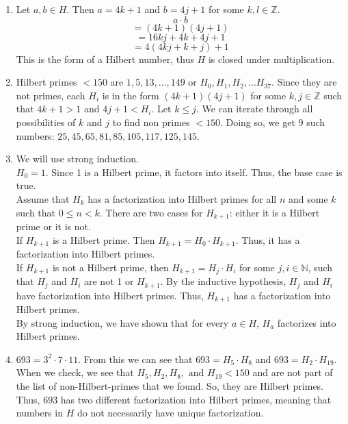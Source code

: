 \documentclass{article}
\begin{document}
\begin{solution}{}{}
    \begin{enumerate}[label=\textbf{\alph*}.]
        \item Let $a,b\in H$. Then $a=4k+1$ and $b=4j+1$ for some $k,l\in\mathbb{Z}$.
        \[a\cdot b\]
        \[=(4k+1)(4j+1)\]
        \[=16kj+4k+4j+1\]
        \[=4(4kj+k+j)+1\]
        This is the form of a Hilbert number, thus $H$ is closed under multiplication.
        \item Hilbert primes $<150$ are $1,5,13,\dots,149$ or $H_0,H_1,H_2,\dots H_{37}$. Since they are not primes, each $H_i$ is in the form $(4k+1)(4j+1)$ for some $k,j\in\mathbb{Z}$ such that $4k+1>1$ and $4j+1<H_i$. Let $k\leq j$. We can iterate through all possibilities of $k$ and $j$ to find non primes $<150$. Doing so, we get 9 such numbers: $25,45,65,81,85,105,117,125,145$.
        \item We will use strong induction. \\
         $H_0=1$. Since 1 is a Hilbert prime, it factors into itself. Thus, the base case is true.\\
         Assume that $H_k$ has a factorization into Hilbert primes for all $n$ and some $k$ such that $0\leq n<k$.
        There are two cases for $H_{k+1}$: either it is a Hilbert prime or it is not.\\
         If $H_{k+1}$ is a Hilbert prime. Then $H_{k+1}=H_0\cdot H_{k+1}$. Thus, it has a factorization into Hilbert primes.\\
         If $H_{k+1}$ is not a Hilbert prime, then $H_{k+1}=H_j\cdot H_i$ for some $j,i\in\mathbb{N}$, such that $H_j$ and $H_i$ are not 1 or $H_{k+1}$. By the inductive hypothesis, $H_j$ and $H_i$ have factorization into Hilbert primes. Thus, $H_{k+1}$ has a factorization into Hilbert primes.\\
        By strong induction, we have shown that for every $a\in H$, $H_a$ factorizes into Hilbert primes.
        \item $693=3^2\cdot 7\cdot 11$. From this we can see that $693=H_5\cdot H_8$ and $693=H_2\cdot H_{19}$. When we check, we see that $H_5,H_2,H_8,\text{ and }H_{19}<150$ and are not part of the list of non-Hilbert-primes that we found. So, they are Hilbert primes. Thus, $693$ has two different factorization into Hilbert primes, meaning that numbers in $H$ do not necessarily have unique factorization.

\end{enumerate}
\end{solution}
\end{document}
